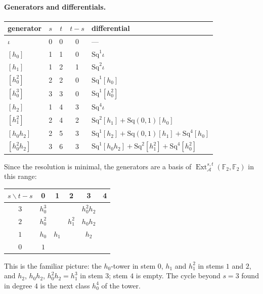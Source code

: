 \documentclass[11pt]{article}
\newcommand{\Sq}{\mathrm{Sq}}
\newcommand{\F}{\mathbb{F}_2}
\newcommand{\A}{\mathcal{A}}
\DeclareMathOperator{\Ext}{Ext}
\begin{document}
\paragraph{Generators and differentials.}
\begin{center}
\begin{tabular}{lcccl}
\toprule
generator & $s$ & $t$ & $t-s$ & differential \\
\midrule
$\iota$ & 0 & 0 & 0 & --- \\
$[h_0]$ & 1 & 1 & 0 & $\Sq^{1}\iota$ \\
$[h_1]$ & 1 & 2 & 1 & $\Sq^{2}\iota$ \\
$[h_0^2]$ & 2 & 2 & 0 & $\Sq^{1}[h_0]$ \\
$[h_0^3]$ & 3 & 3 & 0 & $\Sq^{1}[h_0^2]$ \\
$[h_2]$ & 1 & 4 & 3 & $\Sq^{4}\iota$ \\
$[h_1^2]$ & 2 & 4 & 2 & $\Sq^{2}[h_1] + \Sq(0,1)[h_0]$ \\
$[h_0h_2]$ & 2 & 5 & 3 & $\Sq^{1}[h_2] + \Sq(0,1)[h_1] + \Sq^{4}[h_0]$ \\
$[h_0^2h_2]$ & 3 & 6 & 3 & $\Sq^{1}[h_0h_2] + \Sq^{2}[h_1^2] + \Sq^{4}[h_0^2]$ \\
\bottomrule
\end{tabular}
\end{center}
Since the resolution is minimal, the generators are a basis of $\Ext_\A^{s,t}(\F,\F)$ in this
range:
\begin{center}
\begin{tabular}{c|ccccc}
$s \backslash t-s$ & 0 & 1 & 2 & 3 & 4 \\
\midrule
$3$ & $h_0^3$ &  &  & $h_0^2h_2$ &  \\
$2$ & $h_0^2$ &  & $h_1^2$ & $h_0h_2$ &  \\
$1$ & $h_0$ & $h_1$ &  & $h_2$ &  \\
$0$ & $1$ &  &  &  &  \\
\end{tabular}
\end{center}
This is the familiar picture: the $h_0$-tower in stem $0$, $h_1$ and $h_1^2$ in stems $1$ and
$2$, and $h_2$, $h_0h_2$, $h_0^2h_2 = h_1^3$ in stem $3$; stem $4$ is empty.
The cycle beyond $s = 3$ found in degree $4$ is the next class $h_0^4$ of the tower.
\end{document}
